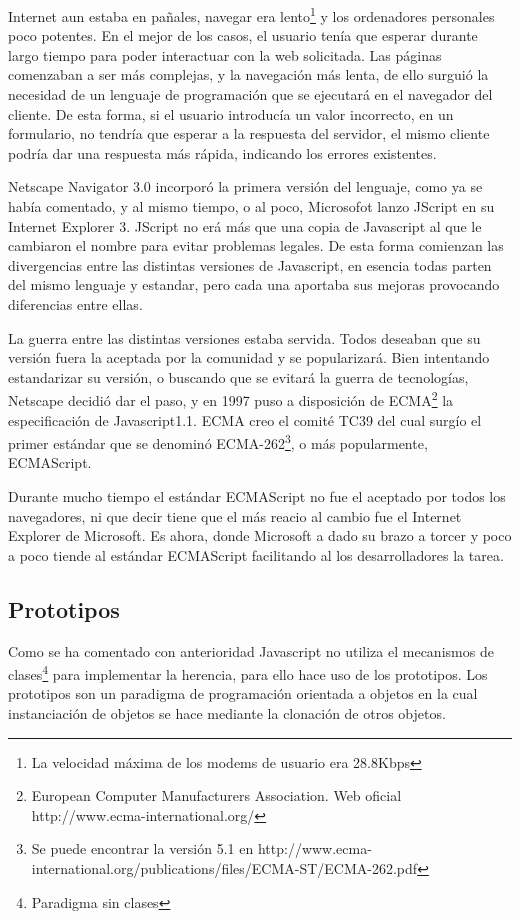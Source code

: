 Internet aun estaba en pañales, navegar era lento\footnote{La velocidad máxima de los modems de
  usuario era 28.8Kbps} y los ordenadores personales poco potentes. En el mejor de los casos, el
usuario tenía que esperar durante largo tiempo para poder interactuar con la web solicitada.  Las
páginas comenzaban a ser más complejas, y la navegación más lenta, de ello surguió la necesidad de
un lenguaje de programación que se ejecutará en el navegador del cliente. De esta forma, si el
usuario introducía un valor incorrecto, en un formulario, no tendría que esperar a la respuesta del
servidor, el mismo cliente podría dar una respuesta más rápida, indicando los errores existentes.

Netscape Navigator 3.0 incorporó la primera versión del lenguaje, como ya se había comentado, y al
mismo tiempo, o al poco, Microsofot lanzo JScript en su Internet Explorer 3. JScript no erá más que 
una copia de Javascript al que le cambiaron el nombre para evitar problemas legales. De esta
forma comienzan las divergencias entre las distintas versiones de Javascript, en esencia todas
parten del mismo lenguaje y estandar, pero cada una aportaba sus mejoras provocando diferencias
entre ellas. 

La guerra entre las distintas versiones estaba servida. Todos deseaban que su versión fuera la
aceptada por la comunidad y se popularizará. Bien intentando estandarizar su versión, o buscando
que se evitará la guerra de tecnologías, Netscape decidió dar el paso, y en 1997 puso a disposición
de ECMA\footnote{European Computer Manufacturers Association. Web oficial
  http://www.ecma-international.org/} la especificación de Javascript1.1. ECMA creo el comité TC39
del cual surgío el primer estándar que se denominó ECMA-262\footnote{Se puede encontrar la versión 5.1 en
  http://www.ecma-international.org/publications/files/ECMA-ST/ECMA-262.pdf}, o más popularmente, 
ECMAScript. 

Durante mucho tiempo el estándar ECMAScript no fue el aceptado por todos los navegadores, ni que
decir tiene que el más reacio al cambio fue el Internet Explorer de Microsoft. Es ahora, donde
Microsoft a dado su brazo a torcer y poco a poco tiende al estándar ECMAScript facilitando al los
desarrolladores la tarea.

\subsection{Prototipos}

Como se ha comentado con anterioridad Javascript no utiliza el mecanismos de clases\footnote{Paradigma sin clases} para implementar la herencia, para ello hace uso de los prototipos. Los prototipos son un paradigma de programación orientada a objetos en la cual instanciación de objetos se hace mediante la clonación de otros objetos. 

